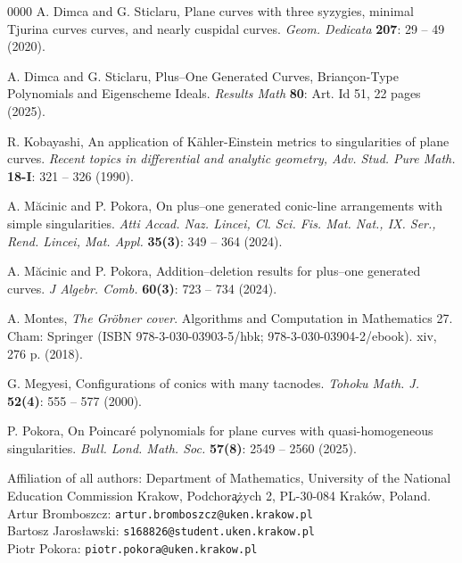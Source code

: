 \documentclass[11pt]{article}
\theoremstyle{plain}
\theoremstyle{definition}
\begin{document}
\begin{thebibliography}{0000}
A. Dimca and G. Sticlaru, Plane curves with three syzygies, minimal Tjurina curves curves, and nearly cuspidal curves. \textit{Geom. Dedicata}  {\bf 207}:  29 -- 49 (2020).

A. Dimca and G. Sticlaru, Plus--One Generated Curves, Briançon-Type Polynomials and Eigenscheme Ideals. \textit{Results Math}  \textbf{80}: Art. Id 51, 22 pages (2025).

R. Kobayashi, An application of Kähler-Einstein metrics to singularities of plane curves. \textit{Recent topics in differential and analytic geometry, Adv. Stud. Pure Math.} \textbf{18-I}: 321 -- 326 (1990).

A. M\u acinic and P. Pokora, On plus--one generated conic-line arrangements with simple singularities. \textit{Atti Accad. Naz. Lincei, Cl. Sci. Fis. Mat. Nat., IX. Ser., Rend. Lincei, Mat. Appl.} \textbf{35(3)}: 349 -- 364 (2024).

A. M\u acinic and P. Pokora, Addition–deletion results for plus--one generated curves. \textit{J Algebr. Comb.} \textbf{60(3)}: 723 -- 734 (2024).

A. Montes, \textit{The Gr\"obner cover}. Algorithms and Computation in Mathematics 27. Cham: Springer (ISBN 978-3-030-03903-5/hbk; 978-3-030-03904-2/ebook). xiv, 276 p. (2018).

G. Megyesi, Configurations of conics with many tacnodes. \textit{Tohoku Math. J.} \textbf{52(4)}: 555 -- 577 (2000).

P. Pokora, On Poincar\'e polynomials for plane curves with quasi-homogeneous singularities. \textit{Bull. Lond. Math. Soc.} \textbf{57(8)}: 2549 -- 2560 (2025).

\end{thebibliography}

\bigskip
Affiliation of all authors:
\noindent
Department of Mathematics,
University of the National Education Commission Krakow,
Podchor\c a\.zych 2,
PL-30-084 Krak\'ow, Poland. \\
\nopagebreak
\vskip0.25cm
\noindent
Artur Bromboszcz: \texttt{artur.bromboszcz@uken.krakow.pl}\\
Bartosz Jaros\l awski: \texttt{s168826@student.uken.krakow.pl} \\
Piotr Pokora: \texttt{piotr.pokora@uken.krakow.pl}
\end{document}
